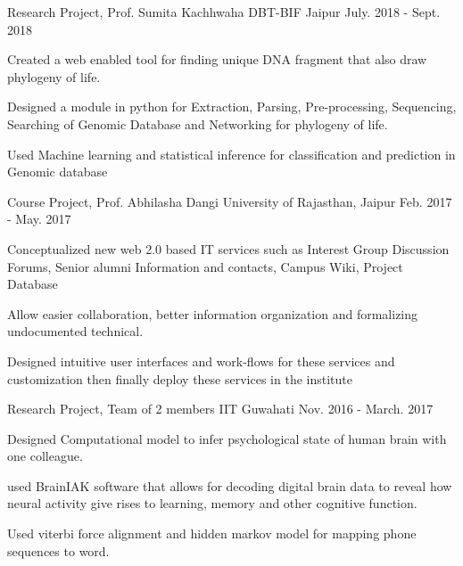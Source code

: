 

\begin{cventries}

  \cventry
  {Research Project, Prof. Sumita Kachhwaha}
  {\href{https://github.com/DBT-BIF/Biosensor-Python}{}
    {}}
  {DBT-BIF Jaipur}
  {July. 2018 - Sept. 2018}
  {
    \begin{cvitems}
    \item Created a web enabled tool for finding unique DNA fragment that also draw phylogeny
     of life.
    \item Designed a module in python for Extraction, Parsing, Pre-processing, Sequencing, Searching of Genomic Database and Networking for phylogeny of life.
    \item Used Machine learning and statistical inference for classification and prediction in Genomic database
    \end{cvitems}
  }
  \cventry
  {Course Project, Prof. Abhilasha Dangi}
  {}
  {University of Rajasthan, Jaipur}
  {Feb. 2017 - May. 2017}
  {
    \begin{cvitems}
      \item Conceptualized new web 2.0 based IT services such as Interest Group Discussion Forums,
       Senior alumni Information and contacts, Campus Wiki, Project Database
      \item Allow easier collaboration, better information organization and formalizing
       undocumented technical.
      \item Designed intuitive user interfaces and work-flows for these services and
       customization then finally deploy these services in the institute
    \end{cvitems}
  }
    
  \cventry
  {Research Project, Team of 2 members}
  {}
  {IIT Guwahati}
  {Nov. 2016 - March. 2017}
  {
    \begin{cvitems}
      \item Designed Computational model to infer psychological state of human brain with one colleague.
      \item used BrainIAK software that allows for decoding digital brain data to reveal
      how neural activity give rises to learning, memory and other cognitive function.
      \item Used viterbi force alignment and hidden markov model for mapping phone sequences to word. 
    \end{cvitems}
  }


\end{cventries}
